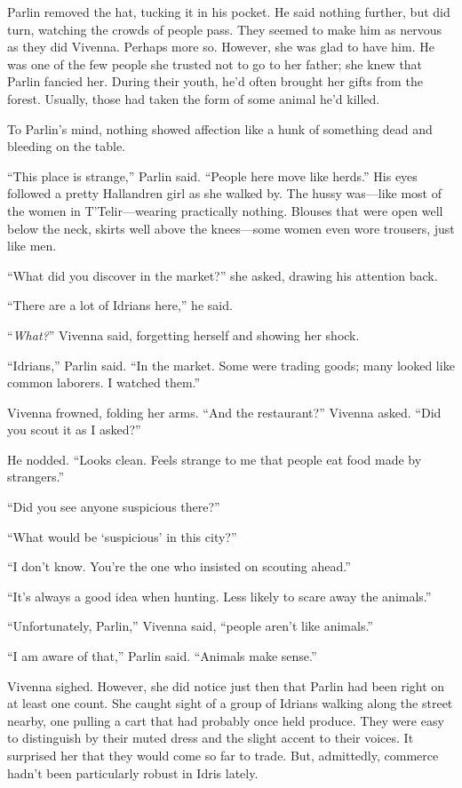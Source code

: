 Parlin removed the hat, tucking it in his pocket. He said nothing further, but did turn, watching the crowds of people pass. They seemed to make him as nervous as they did Vivenna. Perhaps more so. However, she was glad to have him. He was one of the few people she trusted not to go to her father; she knew that Parlin fancied her. During their youth, he’d often brought her gifts from the forest. Usually, those had taken the form of some animal he’d killed.

To Parlin’s mind, nothing showed affection like a hunk of something dead and bleeding on the table.

“This place is strange,” Parlin said. “People here move like herds.” His eyes followed a pretty Hallandren girl as she walked by. The hussy was—like most of the women in T’Telir—wearing practically nothing. Blouses that were open well below the neck, skirts well above the knees—some women even wore trousers, just like men.

“What did you discover in the market?” she asked, drawing his attention back.

“There are a lot of Idrians here,” he said.

“\textit{What?}” Vivenna said, forgetting herself and showing her shock.

“Idrians,” Parlin said. “In the market. Some were trading goods; many looked like common laborers. I watched them.”

Vivenna frowned, folding her arms. “And the restaurant?” Vivenna asked. “Did you scout it as I asked?”

He nodded. “Looks clean. Feels strange to me that people eat food made by strangers.”

“Did you see anyone suspicious there?”

“What would be ‘suspicious’ in this city?”

“I don’t know. You’re the one who insisted on scouting ahead.”

“It’s always a good idea when hunting. Less likely to scare away the animals.”

“Unfortunately, Parlin,” Vivenna said, “people aren’t like animals.”

“I am aware of that,” Parlin said. “Animals make sense.”

Vivenna sighed. However, she did notice just then that Parlin had been right on at least one count. She caught sight of a group of Idrians walking along the street nearby, one pulling a cart that had probably once held produce. They were easy to distinguish by their muted dress and the slight accent to their voices. It surprised her that they would come so far to trade. But, admittedly, commerce hadn’t been particularly robust in Idris lately.

